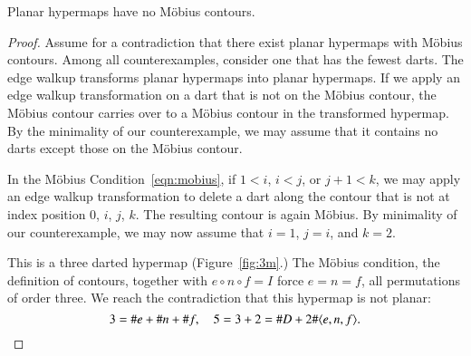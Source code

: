 \begin{lemma}\label{lemma:no-mobius}  
Planar hypermaps have no M\"obius contours.
\end{lemma}

\begin{proof} Assume for a contradiction that there exist planar
hypermaps with M\"obius contours.  Among all counterexamples,
consider one that has the fewest darts.  The edge walkup transforms
planar hypermaps into planar hypermaps.  If we apply an edge walkup
transformation on a dart that is not on the M\"obius contour, the
M\"obius contour carries over to a M\"obius contour 
in the transformed hypermap.  By the
minimality of our counterexample, we may assume that it contains no
darts except those on the M\"obius contour.

In the M\"obius Condition~\ref{eqn:mobius}, if $1<i$, $i<j$, or
$j+1<k$, we may apply an edge walkup transformation to  delete a
dart along the contour that is not at index position $0$, $i$,
$j$, $k$.  The resulting contour is again M\"obius.
By minimality of our counterexample, we may now assume
that $i=1$, $j=i$, and $k=2$.

This is a three darted hypermap (Figure~\ref{fig:3m}.)  
The M\"obius condition, the
definition of contours, together with $e\circ n\circ f=I$ force
$e=n=f$, all permutations of order three. We reach the contradiction
that this hypermap is not planar:
    $$3 = \# e + \# n + \# f,\quad 5 = 3+2 = \# D + 2 \#\langle e,n,f\rangle.$$
\end{proof}

